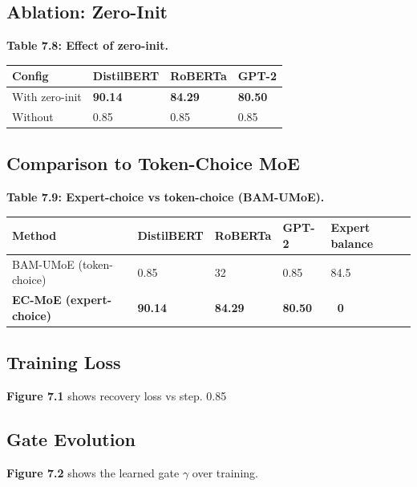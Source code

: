 \subsection{Ablation: Zero-Init}

\textbf{Table 7.8: Effect of zero-init.}

\begin{table}[H]
\centering
\small
\begin{tabular}{llll}
\toprule
\textbf{Config} & \textbf{DistilBERT} & \textbf{RoBERTa} & \textbf{GPT-2} \\
\midrule
With zero-init & \textbf{90.14} & \textbf{84.29} & \textbf{80.50} \\
Without & 0.85 & 0.85 & 0.85 \\
\bottomrule
\end{tabular}
\end{table}

\subsection{Comparison to Token-Choice MoE}

\textbf{Table 7.9: Expert-choice vs token-choice (BAM-UMoE).}

\begin{table}[H]
\centering
\small
\begin{tabular}{lllll}
\toprule
\textbf{Method} & \textbf{DistilBERT} & \textbf{RoBERTa} & \textbf{GPT-2} & \textbf{Expert balance} \\
\midrule
BAM-UMoE (token-choice) & 0.85 & 32 & 0.85 & 84.5 \\
\textbf{EC-MoE (expert-choice)} & \textbf{90.14} & \textbf{84.29} & \textbf{80.50} & \textbf{~0} \\
\bottomrule
\end{tabular}
\end{table}

\subsection{Training Loss}

\textbf{Figure 7.1} shows recovery loss vs step. 0.85

\subsection{Gate Evolution}

\textbf{Figure 7.2} shows the learned gate $\gamma$ over training.

